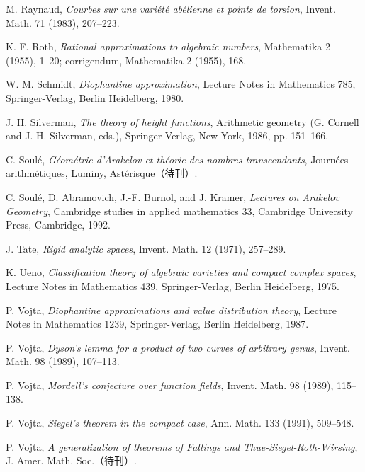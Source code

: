\begin{description}[style=nextline,leftmargin=4em,font=\normalfont\bfseries]
\item[{[Ra]}] M. Raynaud, \emph{Courbes sur une variété abélienne et points de torsion}, Invent. Math. 71 (1983), 207--223.
\item[{[Ro]}] K. F. Roth, \emph{Rational approximations to algebraic numbers}, Mathematika 2 (1955), 1--20; corrigendum, Mathematika 2 (1955), 168.
\item[{[Sch]}] W. M. Schmidt, \emph{Diophantine approximation}, Lecture Notes in Mathematics 785, Springer-Verlag, Berlin Heidelberg, 1980.
\item[{[Sil]}] J. H. Silverman, \emph{The theory of height functions}, Arithmetic geometry (G. Cornell and J. H. Silverman, eds.), Springer-Verlag, New York, 1986, pp. 151--166.
\item[{[So]}] C. Soulé, \emph{Géométrie d'Arakelov et théorie des nombres transcendants}, Journées arithmétiques, Luminy, Astérisque（待刊）.
\item[{[So 2]}] C. Soulé, D. Abramovich, J.-F. Burnol, and J. Kramer, \emph{Lectures on Arakelov Geometry}, Cambridge studies in applied mathematics 33, Cambridge University Press, Cambridge, 1992.
\item[{[T]}] J. Tate, \emph{Rigid analytic spaces}, Invent. Math. 12 (1971), 257--289.
\item[{[U]}] K. Ueno, \emph{Classification theory of algebraic varieties and compact complex spaces}, Lecture Notes in Mathematics 439, Springer-Verlag, Berlin Heidelberg, 1975.
\item[{[V 1]}] P. Vojta, \emph{Diophantine approximations and value distribution theory}, Lecture Notes in Mathematics 1239, Springer-Verlag, Berlin Heidelberg, 1987.
\item[{[V 2]}] P. Vojta, \emph{Dyson's lemma for a product of two curves of arbitrary genus}, Invent. Math. 98 (1989), 107--113.
\item[{[V 3]}] P. Vojta, \emph{Mordell's conjecture over function fields}, Invent. Math. 98 (1989), 115--138.
\item[{[V 4]}] P. Vojta, \emph{Siegel's theorem in the compact case}, Ann. Math. 133 (1991), 509--548.
\item[{[V 5]}] P. Vojta, \emph{A generalization of theorems of Faltings and Thue-Siegel-Roth-Wirsing}, J. Amer. Math. Soc.（待刊）.
\end{description}
